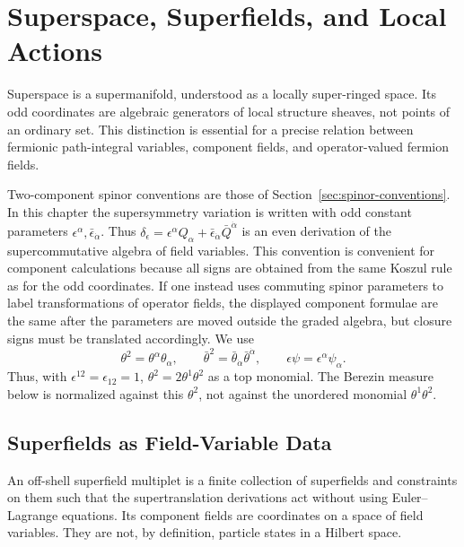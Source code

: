 \chapter{Superspace, Superfields, and Local Actions}
\label{ch:susy-superspace-superfields-local-actions}

\ConventionsLorentzian

Superspace is a supermanifold, understood as a locally super-ringed space.
Its odd coordinates are algebraic generators of local structure sheaves, not
points of an ordinary set.  This distinction is essential for a precise
relation between fermionic path-integral variables, component fields, and
operator-valued fermion fields.

Two-component spinor conventions are those of
Section~\ref{sec:spinor-conventions}.  In this chapter the supersymmetry
variation is written with odd constant parameters
\(\epsilon^\alpha,\bar\epsilon_{\dot\alpha}\).  Thus
\(\delta_\epsilon=\epsilon^\alpha Q_\alpha+
\bar\epsilon_{\dot\alpha}\bar Q^{\dot\alpha}\) is an even derivation of the
supercommutative algebra of field variables.  This convention is convenient
for component calculations because all signs are obtained from the same
Koszul rule as for the odd coordinates.  If one instead uses commuting spinor
parameters to label transformations of operator fields, the displayed
component formulae are the same after the parameters are moved outside the
graded algebra, but closure signs must be translated accordingly.
We use
\[
  \theta^2=\theta^\alpha\theta_\alpha,\qquad
  \bar\theta^2=\bar\theta_{\dot\alpha}\bar\theta^{\dot\alpha},
  \qquad
  \epsilon\psi=\epsilon^\alpha\psi_\alpha .
\]
Thus, with \(\epsilon^{12}=\epsilon_{12}=1\),
\(\theta^2=2\theta^1\theta^2\) as a top monomial.  The Berezin measure below
is normalized against this \(\theta^2\), not against the unordered monomial
\(\theta^1\theta^2\).

\section{Superfields as Field-Variable Data}

\begin{definition}
\label{def:off-shell-superfield-multiplet}
An off-shell superfield multiplet is a finite collection of superfields and
constraints on them such that the supertranslation derivations act without
using Euler--Lagrange equations.  Its component fields are coordinates on a
space of field variables.  They are not, by definition, particle states in a
Hilbert space.
\end{definition}

